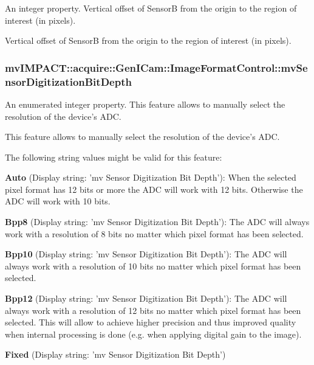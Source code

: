 An integer property. Vertical offset of Sensor\+B from the origin to the region of interest (in pixels). 

Vertical offset of Sensor\+B from the origin to the region of interest (in pixels). \hypertarget{classmv_i_m_p_a_c_t_1_1acquire_1_1_gen_i_cam_1_1_image_format_control_ac7618e267ca5f88f5a9c295069653fb1}{
\subsubsection[{mv\+Sensor\+Digitization\+Bit\+Depth}]{ mv\+I\+M\+P\+A\+C\+T\+::acquire\+::\+Gen\+I\+Cam\+::\+Image\+Format\+Control\+::mv\+Sensor\+Digitization\+Bit\+Depth}}\label{classmv_i_m_p_a_c_t_1_1acquire_1_1_gen_i_cam_1_1_image_format_control_ac7618e267ca5f88f5a9c295069653fb1}


An enumerated integer property. This feature allows to manually select the resolution of the device's A\+D\+C. 

This feature allows to manually select the resolution of the device's A\+D\+C.

The following string values might be valid for this feature\+:
\begin{DoxyItemize}
\item {\bfseries Auto} (Display string\+: 'mv Sensor Digitization Bit Depth')\+: When the selected pixel format has 12 bits or more the A\+D\+C will work with 12 bits. Otherwise the A\+D\+C will work with 10 bits.
\item {\bfseries Bpp8} (Display string\+: 'mv Sensor Digitization Bit Depth')\+: The A\+D\+C will always work with a resolution of 8 bits no matter which pixel format has been selected.
\item {\bfseries Bpp10} (Display string\+: 'mv Sensor Digitization Bit Depth')\+: The A\+D\+C will always work with a resolution of 10 bits no matter which pixel format has been selected.
\item {\bfseries Bpp12} (Display string\+: 'mv Sensor Digitization Bit Depth')\+: The A\+D\+C will always work with a resolution of 12 bits no matter which pixel format has been selected. This will allow to achieve higher precision and thus improved quality when internal processing is done (e.\+g. when applying digital gain to the image).
\item {\bfseries Fixed} (Display string\+: 'mv Sensor Digitization Bit Depth')
\end{DoxyItemize}


